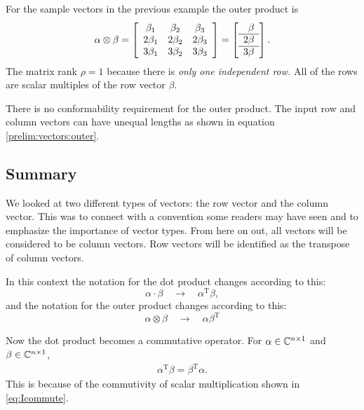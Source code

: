 For the sample vectors in the previous example the outer product is
\begin{equation}
  \alpha \otimes \beta = \mat{ccc}
  {
   \beta_{1} &  \beta_{2} &  \beta_{3} \\
  2\beta_{1} & 2\beta_{2} & 2\beta_{3} \\
  3\beta_{1} & 3\beta_{2} & 3\beta_{3} \\
  }
  =
  \mat{r}
  {
   \beta \\\hline{}
  2\beta \\\hline{}
  3\beta \\
  }.
\end{equation}
The matrix rank $\rho = 1$ because there is \textit{only one independent row.} All of the rows are scalar multiples of the row vector $\beta$.

There is no conformability requirement for the outer product. The input row and column vectors can have unequal lengths as shown in equation \eqref{prelim:vectors:outer}.

\subsection{Summary}
We looked at two different types of vectors: the row vector and the column vector. This was to connect with a convention some readers may have seen and to emphasize the importance of vector types. From here on out, all vectors will be considered to be column vectors. Row vectors will be identified as the transpose of column vectors. 

In this context the notation for the dot product changes according to this:
\begin{equation}
  \alpha\cdot\beta \quad \to \quad \alpha^{\mathrm{T}}\beta,
\end{equation}
and the notation for the outer product changes according to this:
\begin{equation}
  \alpha\otimes\beta \quad \to \quad \alpha\beta^{\mathrm{T}}
\end{equation}

Now the dot product becomes a commutative operator. For $\alpha \in\cmplx{n\times1}$ and $\beta \in\cmplx{n\times1}$,
\begin{equation}
\begin{split}
  \alpha^{\mathrm{T}}\beta  = \beta^{\mathrm{T}}\alpha.
\end{split}
\end{equation}
This is because of the commutivity of scalar multiplication shown in \eqref{eq:Icommute}.

